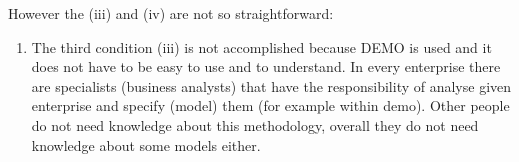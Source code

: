 However the (iii) and (iv) are not so straightforward:

\begin{enumerate}
\item The third condition (iii) is not accomplished because DEMO is used and it does not have to be easy to use and to understand. In every enterprise there are specialists (business analysts) that have the responsibility of analyse given enterprise and specify (model) them (for example within \gls{demo}). Other people do not need knowledge about this methodology, overall they do not need knowledge about some models either.
\end{enumerate}


    
    
	
    

   


